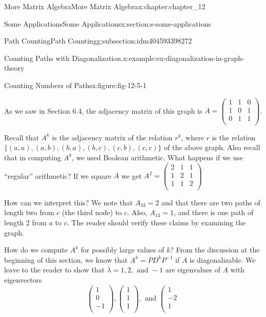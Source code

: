 \documentclass[twoside,10pt,]{book}
\numberwithin{equation}{section}
\begin{document}
\begin{chapterptx}{More Matrix Algebra}{}{More Matrix Algebra}{}{}{x:chapter:chapter_12}
\begin{sectionptx}{Some Applications}{}{Some Applications}{}{}{x:section:s-some-applications}
\begin{subsectionptx}{Path Counting}{}{Path Counting}{}{}{g:subsection:idm404593398272}
\begin{example}{Counting Paths with Diagonalization.}{x:example:ex-diagonalization-in-graph-theory}
\begin{figureptx}{Counting Numbers of Paths}{x:figure:fig-12-5-1}{}
\begin{image}{0.15}{0.7}{0.15}
\end{image}%
\tcblower
\end{figureptx}%
As we saw in Section 6.4, the adjacency matrix of this graph is \(A=\left(
\begin{array}{ccc}
1 & 1 & 0 \\
1 & 0 & 1 \\
0 & 1 & 1 \\
\end{array}
\right)\).%
\par
Recall that \(A^k\) is the adjacency matrix of the relation \(r^k\), where \(r\) is the relation \(\{(a, a), (a, b), (b, a), (b, c), (c, b), (c, c)\}\) of the above graph. Also recall that in computing \(A^k\), we used Boolean arithmetic. What happens if we use ``regular'' arithmetic?  If we square \(A\) we get \(A^2 = \left(
\begin{array}{ccc}
2 & 1 & 1 \\
1 & 2 & 1 \\
1 & 1 & 2 \\
\end{array}
\right)\)%
\par
How can we interpret this? We note that \(A_{33} = 2\) and that there are two paths of length two from \(c\) (the third node) to \(c\). Also, \(A_{13} = 1\), and there is one path of length 2 from \(a\) to  \(c\). The reader should verify these claims by examining the graph.%
\par
How do we compute \(A^k\) for possibly large values of \(k\)? From the discussion at the beginning of this section, we know that \(A^k= P D^kP^{-1}\) if \(A\) is diagonalizable. We leave to the reader to show that \(\lambda  = 1, 2,\textrm{ and } -1\) are eigenvalues of \(A\) with eigenvectors%
\begin{equation*}
\left(
\begin{array}{c}
1 \\
0 \\
-1 \\
\end{array}
\right),\left(
\begin{array}{c}
1 \\
1 \\
1 \\
\end{array}
\right), \textrm{ and } \left(
\begin{array}{c}
1 \\
-2 \\
1 \\
\end{array}

\end{equation*}
\end{example}
\end{subsectionptx}
\end{sectionptx}
\end{chapterptx}
\end{document}

